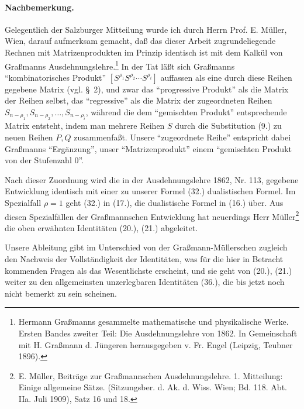 \documentclass[11pt]{article}
\begin{document}
\paragraph{Nachbemerkung.} Gelegentlich der Salzburger Mitteilung wurde ich durch Herrn Prof. E. Müller, Wien, darauf aufmerksam gemacht, daß das dieser Arbeit zugrundeliegende Rechnen mit Matrizenprodukten im Prinzip identisch ist mit dem Kalkül von Graßmanns Ausdehnungslehre.\footnote{Hermann Graßmanns gesammelte mathematische und physikalische Werke. Ersten Bandes zweiter Teil: Die Ausdehnungslehre von 1862. In Gemeinschaft mit H. Graßmann d. Jüngeren herausgegeben v. Fr. Engel (Leipzig, Teubner 1896).} In der Tat läßt sich Graßmanns ``kombinatorisches Produkt'' $[S^{\rho_1}S^{\rho_2}\cdots S^{\rho_i}]$ auffassen als eine durch diese Reihen gegebene Matrix (vgl. \S\ 2), und zwar das ``progressive Produkt'' als die Matrix der Reihen selbst, das ``regressive'' als die Matrix der zugeordneten Reihen $S_{n-\rho_1},S_{n-\rho_2},\ldots,S_{n-\rho_i}$, während die dem ``gemischten Produkt'' entsprechende Matrix entsteht, indem man mehrere Reihen $S$ durch die Substitution (9.) zu neuen Reihen $P,Q$ zusammenfaßt. Unsere ``zugeordnete Reihe'' entspricht dabei Graßmanns ``Ergänzung'', unser ``Matrizenprodukt'' einem ``gemischten Produkt von der Stufenzahl 0''.

Nach dieser Zuordnung wird die in der Ausdehnungslehre 1862, Nr. 113, gegebene Entwicklung identisch mit einer zu unserer Formel (32.) dualistischen Formel. Im Spezialfall $\rho=1$ geht (32.) in (17.), die dualistische Formel in (16.) über. Aus diesen Spezialfällen der Graßmannschen Entwicklung hat neuerdings Herr Müller\footnote{E. Müller, Beiträge zur Graßmannschen Ausdehnungslehre. 1. Mitteilung: Einige allgemeine Sätze. (Sitzungsber. d. Ak. d. Wiss. Wien; Bd. 118. Abt. IIa. Juli 1909), Satz 16 und 18.} die oben erwähnten Identitäten (20.), (21.) abgeleitet.

Unsere Ableitung gibt im Unterschied von der Graßmann-Müllerschen zugleich den Nachweis der Vollständigkeit der Identitäten, was für die hier in Betracht kommenden Fragen als das Wesentlichste erscheint, und sie geht von (20.), (21.) weiter zu den allgemeinsten unzerlegbaren Identitäten (36.), die bis jetzt noch nicht bemerkt zu sein scheinen.
\end{document}
